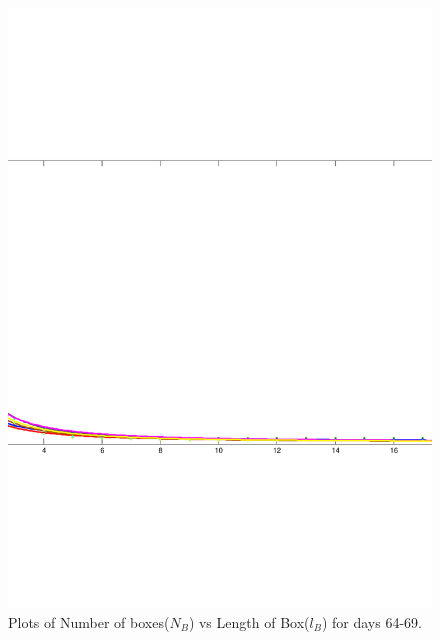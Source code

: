 \documentclass{article}
\begin{document}
\begin{figure}
\centering
\includegraphics[scale=0.3]{plot10/plot10}
\caption{Plots of Number of boxes($N_B$) vs Length of Box($l_B$) for days 64-69.}
\end{figure}
\end{document}
